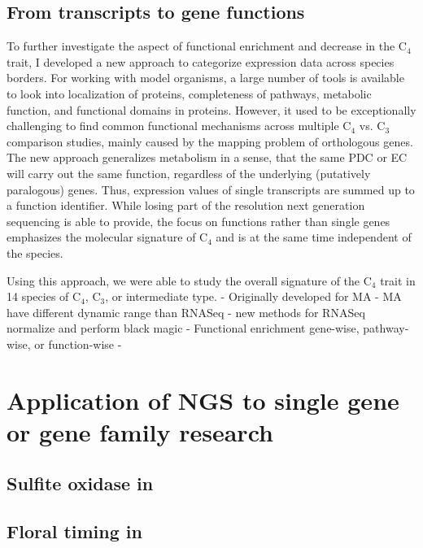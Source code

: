 		\subsection{From transcripts to gene functions}
		To further investigate the aspect of functional enrichment and decrease in the C$_4$ trait, I developed a new approach to categorize expression data across species borders.
		For working with model organisms, a large number of tools is available to look into localization of proteins, completeness of pathways, metabolic function, and functional domains in proteins.
		However, it used to be exceptionally challenging to find common functional mechanisms across multiple C$_4$ vs. C$_3$ comparison studies, mainly caused by the mapping problem of orthologous genes.
		The new approach generalizes metabolism in a sense, that the same \ac{PDC} or \ac{EC} will carry out the same function, regardless of the underlying (putatively paralogous) genes.
		Thus, expression values of single transcripts are summed up to a function identifier.
		While losing part of the resolution next generation sequencing is able to provide, the focus on functions rather than single genes emphasizes the molecular signature of C$_4$ and is at the same time independent of the species.
		
		Using this approach, we were able to study the overall signature of the C$_4$ trait in 14 species of C$_4$, C$_3$, or intermediate type.
		- Originally developed for MA
		- MA have different dynamic range than RNASeq
		- new methods for RNASeq normalize and perform black magic
		- Functional enrichment gene-wise, pathway-wise, or function-wise
		- 
	
 \section{Application of NGS to single gene or gene family research}
 \subsection{Sulfite oxidase in }
 \subsection{Floral timing in }
 

